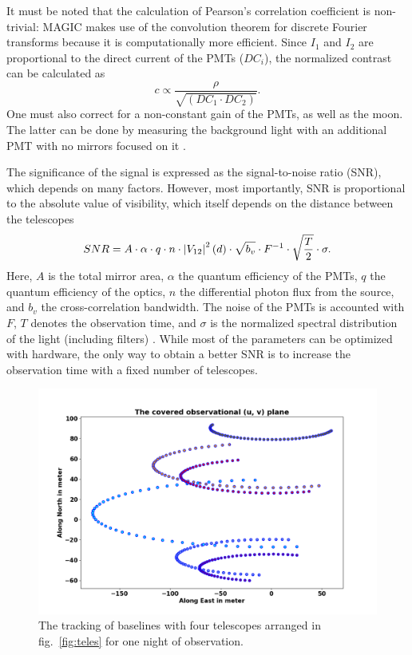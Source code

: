 It must be noted that the calculation of Pearson's correlation coefficient is non-trivial: MAGIC makes use of the convolution theorem for discrete Fourier transforms because it is computationally more efficient. Since $I_1$ and $I_2$ are proportional to the direct current of the PMTs ($DC_i$), the normalized contrast can be calculated as 
\begin{equation}
	c \propto \frac{\rho}{\sqrt{\left(DC_1 \cdot DC_2 \right)}}.
	\label{eq:norm_contrast2}
\end{equation}
One must also correct for a non-constant gain of the PMTs, as well as the moon. The latter can be done by measuring the background light with an additional PMT with no mirrors focused on it \citep{acciari2020optical}.

The significance of the signal is expressed as the signal-to-noise ratio (SNR), which depends on many factors. However, most importantly, SNR is proportional to the absolute value of visibility, which itself depends on the distance between the telescopes \citep{acciari2020optical} 
\begin{equation}
	SNR = A \cdot \alpha \cdot q \cdot n \cdot \left|V_{12}\right|^{2}(d) \cdot \sqrt{b_v} \cdot F^{-1} \cdot \sqrt{\frac{T}{2}} \cdot \sigma.
	\label{eq:SNR}
\end{equation}
Here, $A$ is the total mirror area, $\alpha$ the quantum efficiency of the PMTs, $q$ the quantum efficiency of the optics, $n$ the differential photon flux from the source, and $b_v$ the cross-correlation bandwidth. The noise of the PMTs is accounted with $F$, $T$ denotes the observation time, and $\sigma$ is the normalized spectral distribution of the light (including filters) \citep{acciari2020optical}. While most of the parameters can be optimized with hardware, the only way to obtain a better SNR is to increase the observation time with a fixed number of telescopes.  
\begin{figure}
	\centering
	\includegraphics[width=\linewidth]{fig/baseline.png}
	\caption{The tracking of baselines with four telescopes arranged in fig.~\ref{fig:teles} for one night of observation.}
	\label{fig:base}
\end{figure}

